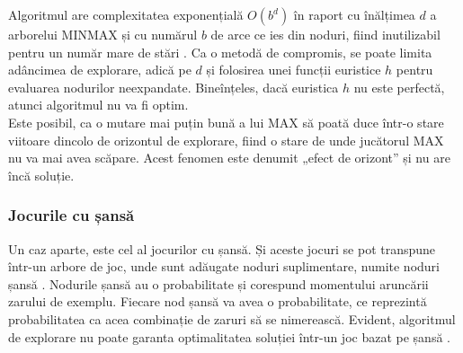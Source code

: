 \documentclass[12pt,twoside,a4paper,fleqn]{book}
\theoremstyle{definition}
\begin{document}
Algoritmul are complexitatea exponențială $O(b^{d})$ în raport cu înălțimea $d$ a arborelui MINMAX și cu numărul $b$ de arce ce ies din noduri, fiind inutilizabil pentru un număr mare de stări \cite{allis, Giumale, games_solved_herik, Rivest}. Ca o metodă de compromis, se poate limita adâncimea de explorare, adică pe $d$ și folosirea unei funcții euristice $h$ pentru evaluarea nodurilor neexpandate. Bineînțeles, dacă euristica $h$ nu este perfectă, atunci algoritmul nu va fi optim.\\
Este posibil, ca o mutare mai puțin bună a lui MAX să poată duce într-o stare viitoare dincolo de orizontul de explorare, fiind o stare de unde jucătorul MAX nu va mai avea scăpare. Acest fenomen este denumit „efect de orizont” \cite{Giumale} și nu are încă soluție.
\subsubsection{Jocurile cu șansă}
Un caz aparte, este cel al jocurilor cu șansă. Și aceste jocuri se pot transpune într-un arbore de joc, unde sunt adăugate noduri suplimentare, numite noduri șansă \cite{Giumale}. Nodurile șansă au o probabilitate și corespund momentului aruncării zarului de exemplu. Fiecare nod șansă va avea o probabilitate, ce reprezintă probabilitatea ca acea combinație de zaruri să se nimerească. Evident, algoritmul de explorare nu poate garanta optimalitatea soluției într-un joc bazat pe șansă \cite{Giumale}.
\end{document}
